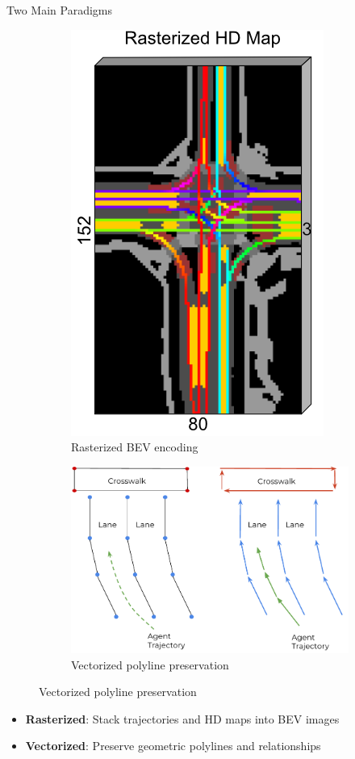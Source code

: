 \documentclass[10pt,aspectratio=169]{beamer}
\begin{document}
\begin{frame}{Two Main Paradigms}
\begin{figure}
\centering
\begin{subfigure}[t]{0.45\textwidth}
    \centering
    \includegraphics[width=0.6\columnwidth,height=0.5\textheight,keepaspectratio]{docs/latex/figures/caspnet-bev-repr.png}
    \caption{Rasterized BEV encoding~\cite{caspnetSchäfer2022}}
    \label{fig:rasterized}
\end{subfigure}
\hfill
\begin{subfigure}[t]{0.5\textwidth}
    \centering
    \includegraphics[width=0.6\columnwidth,height=0.5\textheight,keepaspectratio]{docs/latex/figures/vectornet-2020-vector-repr.pdf}
    \caption{Vectorized polyline preservation~\cite{gao2020vectornet}}
    \label{fig:vectorized}
\end{subfigure}
\end{figure}

\vspace{0.5em}
\begin{itemize}
    \item \textbf{Rasterized}: Stack trajectories and HD maps into BEV images
    \item \textbf{Vectorized}: Preserve geometric polylines and relationships
\end{itemize}
\end{frame}
\end{document}
